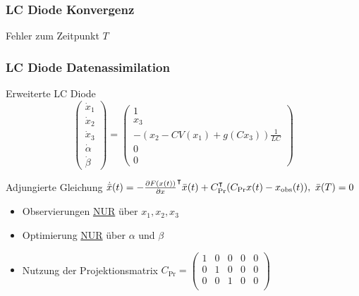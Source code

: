 \begin{frame}[<+->]
\frametitle{LC Diode Konvergenz}
\centering
\begin{minipage}{0.49\linewidth}

\end{minipage}
\begin{minipage}{0.49\linewidth}

\end{minipage}
\centering
Fehler zum Zeitpunkt $T$
\end{frame}

\begin{frame}[<+->]
\frametitle{LC Diode Datenassimilation}
\centering
\begin{block}{Erweiterte LC Diode} 
\[
 \begin{pmatrix}
  \dot x_1\\
  \dot x_2\\
  \dot x_3\\
  \dot \alpha\\
  \dot \beta
 \end{pmatrix}
 = 
 \begin{pmatrix}
  1\\
  x_3\\
  -\left(x_2-CV(x_1) + g(Cx_3)\right)\frac{1}{LC}\\
  0\\
  0
 \end{pmatrix}
\]
\end{block}
\begin{block}{Adjungierte Gleichung}
\centering
  $\dot{ \bar{x}}(t) =  -\frac{\partial F(x(t))}{\partial x}^\intercal \bar x(t) +C_{\text{Pr}}^\intercal(C_{\text{Pr}}x(t) - x_{\text{obs}}(t)), ~ \bar x(T) =0$
\end{block}

\begin{itemize}
 \item Observierungen \underline{NUR} über $x_1,x_2,x_3$
 \item Optimierung \underline{NUR} über $\alpha$ und $\beta$
 \item \vspace*{-0.45cm} Nutzung der Projektionsmatrix $C_{\text{Pr}}=
 \begin{pmatrix}
  1 &0 &0 &0 &0  \\
  0 &1 &0 &0 &0  \\
  0 &0 &1 &0 &0  \\
 \end{pmatrix}
$
\end{itemize}
\end{frame}

